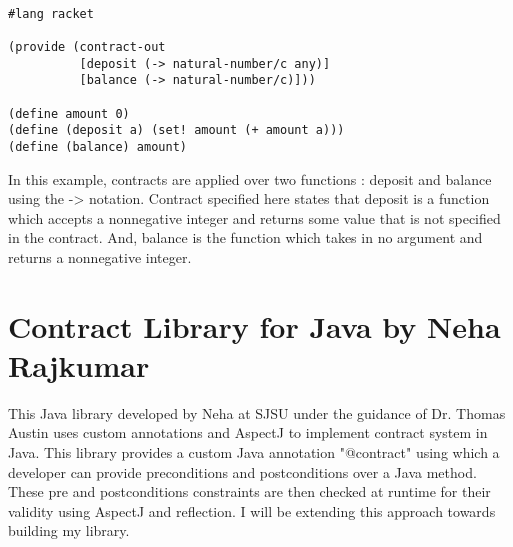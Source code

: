 \begin{minipage}{\linewidth}
\lstset{caption=Contract over functions in Racket, captionpos=b, breaklines=true}       
\begin{lstlisting}[frame=single]

#lang racket

(provide (contract-out
          [deposit (-> natural-number/c any)]
          [balance (-> natural-number/c)]))

(define amount 0)
(define (deposit a) (set! amount (+ amount a)))
(define (balance) amount)

\end{lstlisting}
\end{minipage}

In this example, contracts are applied over two functions : deposit and balance using the -> notation. Contract specified here states that deposit is a function which accepts a nonnegative integer and returns some value that is not specified in the contract. And, balance is the function which takes in no argument and returns a nonnegative integer.

\section{Contract Library for Java by Neha Rajkumar}
This Java library \cite{rajkumar2015designing} developed by Neha at SJSU under the guidance of Dr. Thomas Austin uses custom annotations and AspectJ to implement contract system in Java. This library provides a custom Java annotation "@contract" using which a developer can provide preconditions and postconditions over a Java method. These pre and postconditions constraints are then checked at runtime for their validity using AspectJ and reflection. I will be extending this approach towards building my library.   	     